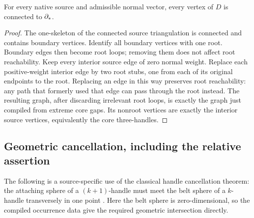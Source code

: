 \begin{lemma}\label{lem:rooted}
For every native source and admissible normal vector, every vertex of $D$
is connected to $\partial_*$.
\end{lemma}
\begin{proof}
The one-skeleton of the connected source triangulation is connected and
contains boundary vertices.  Identify all boundary vertices with one root.
Boundary edges then become root loops; removing them does not affect root
reachability.  Keep every interior source edge of zero normal weight.  Replace
each positive-weight interior edge by two root stubs, one from each of its
original endpoints to the root.  Replacing an edge in this way preserves root
reachability: any path that formerly used that edge can pass through the root
instead.  The resulting graph, after discarding irrelevant root loops, is
exactly the graph just compiled from extreme core gaps.  Its nonroot vertices
are exactly the interior source vertices, equivalently the core three-handles.
\end{proof}

\subsection{Geometric cancellation, including the relative assertion}
The following is a source-specific use of the classical handle cancellation
theorem: the attaching sphere of a $(k+1)$-handle must meet the belt sphere
of a $k$-handle transversely in one point \cite[Theorem~5.4]{Milnor1965}.
Here the belt sphere is zero-dimensional, so the compiled occurrence data
give the required geometric intersection directly.

